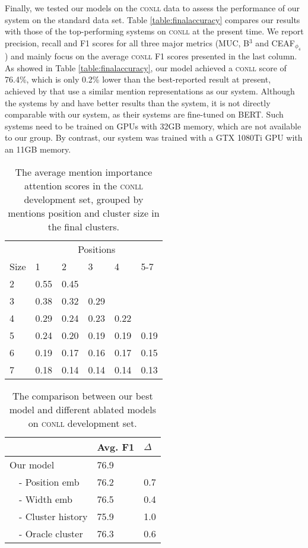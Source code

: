 \documentclass[10pt, a4paper]{article}
\newcommand{\ACRO}[1]{\textsc{#1}}
\newcommand{\CONLL}{\ACRO{conll}}
\begin{document}
Finally, we tested our models on 
the {\CONLL} data to assess the performance of our system on the standard data set. 
Table \ref{table:finalaccuracy} compares our results with those of the top-performing systems on {\CONLL} at the present time. 
We report precision, recall and F1 scores for all three major metrics (MUC, B$^3$ and CEAF$_{\phi_4}$) and mainly focus on the average {\CONLL} F1 scores presented in the last column. As showed in Table \ref{table:finalaccuracy}, our model achieved a {\CONLL} score of 76.4\%, which is only 0.2\% lower than the best-reported result at present, 
achieved by 
\cite{kantor2019bertee} that use a similar mention representations as 
our system. 
Although the systems by  and  have better results than the  system, it is not directly comparable with our system, as their systems are fine-tuned on BERT. 
Such systems need to be trained on GPUs with 32GB memory, which are not available to our group. 
By contrast, our system was trained with 
a GTX 1080Ti GPU with an 11GB memory. 







\begin{table}[t]
\centering
\small
\begin{tabular}{llllll}
\toprule
&\multicolumn{5}{c}{Positions}\\\cmidrule{2-6}
Size&1&2&3&4&5-7\\\midrule
2&0.55&0.45\\ 
3&0.38&0.32&0.29\\
4&0.29&0.24&0.23&0.22\\
5&0.24&0.20&0.19&0.19&0.19\\
6&0.19&0.17&0.16&0.17&0.15\\
7&0.18&0.14&0.14&0.14&0.13\\
\bottomrule
\end{tabular}
\caption{\label{table:cluster_att_eval} The average mention importance attention scores in the {\CONLL} development set, grouped by  mentions position and cluster size in the final clusters. }
\end{table}


\begin{table}[t]
\centering
\small
\begin{tabular}{l l l}
\toprule
&Avg. F1& $\Delta$\\
\midrule
Our model&76.9&\\
\ \ - Position emb&76.2&0.7\\
\ \ - Width emb&76.5&0.4\\
\ \ - Cluster history&75.9&1.0\\
\ \ - Oracle cluster&76.3&0.6\\
\bottomrule
\end{tabular}
\caption{\label{table:analysis} The comparison between our best model and different ablated models on {\CONLL} development set.}
\end{table}
\end{document}
